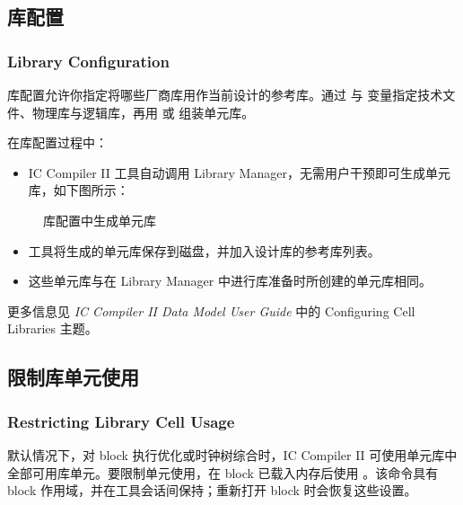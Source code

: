 \subsection{库配置}
\subsubsection*{Library Configuration}

库配置允许你指定将哪些厂商库用作当前设计的参考库。通过  与  变量指定技术文件、物理库与逻辑库，再用  或  组装单元库。

在库配置过程中：
\begin{itemize}
  \item IC Compiler II 工具自动调用 Library Manager，无需用户干预即可生成单元库，如下图所示：
\end{itemize}

\begin{figure}[htbp]
\centering
{}
\caption{库配置中生成单元库}
\label{fig:lib-config}
\end{figure}

\begin{itemize}
  \item 工具将生成的单元库保存到磁盘，并加入设计库的参考库列表。
  \item 这些单元库与在 Library Manager 中进行库准备时所创建的单元库相同。
\end{itemize}

\begin{seeAlsoBox}
更多信息见 \textit{IC Compiler II Data Model User Guide} 中的 Configuring Cell Libraries 主题。
\end{seeAlsoBox}

\subsection{限制库单元使用}
\subsubsection*{Restricting Library Cell Usage}

默认情况下，对 block 执行优化或时钟树综合时，IC Compiler II 可使用单元库中全部可用库单元。要限制单元使用，在 block 已载入内存后使用 。该命令具有 block 作用域，并在工具会话间保持；重新打开 block 时会恢复这些设置。

